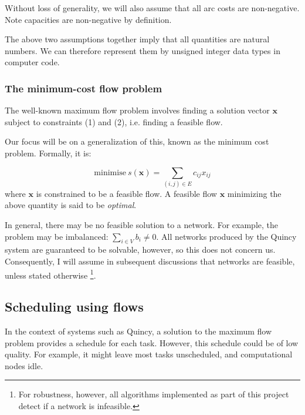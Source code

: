 Without loss of generality, we will also assume that all arc costs
are non-negative\footnotemark. Note capacities are non-negative by definition.

The above two assumptions together imply that all quantities are natural
numbers\footnotemark. We can therefore represent them by unsigned integer data types in computer code.


\subsubsection{The minimum-cost flow problem} \label{sec:prep-flow-mcf}

The well-known maximum flow problem involves finding a solution vector
$\mathbf{x}$ subject to constraints (1) and (2), i.e. finding a feasible
flow.

Our focus will be on a generalization of this, known as the minimum
cost problem. Formally, it is:

\begin{equation}
\mbox{minimise}\ s(\mathbf{x})=\sum_{(i,j)\in E}c_{ij}x_{ij}
\end{equation}
where $\mathbf{x}$ is constrained to be a feasible flow. A feasible
flow $\mathbf{x}$ minimizing the above quantity is said to be \emph{optimal}.

In general, there may be no feasible solution to a network. For example,
the problem may be imbalanced: $\sum_{i\in V}b_{i}\neq0$. All networks
produced by the Quincy system are guaranteed to be solvable, however,
so this does not concern us. Consequently, I will assume in subsequent
discussions that networks are feasible, unless stated otherwise%
\footnote{For robustness, however, all algorithms implemented as part of this project detect if a network is infeasible.}.

\subsection{Scheduling using flows}

In the context of systems such as Quincy, a solution to the maximum
flow problem provides a schedule for each task. However, this schedule
could be of low quality. For example, it might leave most tasks unscheduled,
and computational nodes idle.

